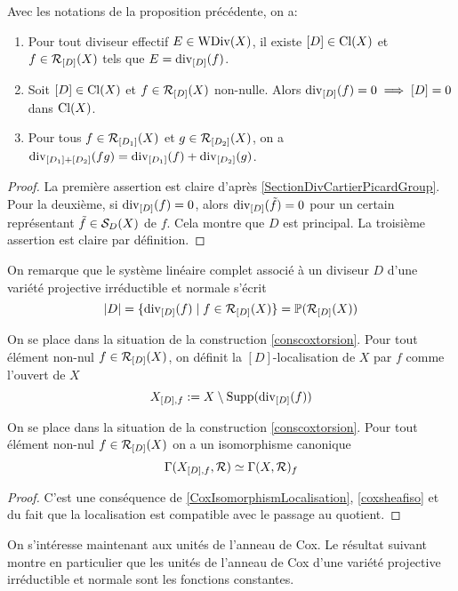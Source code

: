 \begin{prop}\label{diviCoxTorsFormulas}
Avec les notations de la proposition précédente, on a:
\begin{enumerate}
\item Pour tout diviseur effectif $E\in\operatorname{WDiv}(X)$, il existe $[D]\in\operatorname{Cl}(X)$ et $f\in\mathcal{R}_{[D]}(X)$ tels que $E=\operatorname{div}_{[D]}(f)$.
\item Soit $[D]\in\operatorname{Cl}(X)$ et $f\in\mathcal{R}_{[D]}(X)$ non-nulle. Alors $\operatorname{div}_{[D]}(f)=0\implies [D]=0$ dans $\operatorname{Cl}(X)$.
\item Pour tous $f\in\mathcal{R}_{[D_1]}(X)$ et $g\in\mathcal{R}_{[D_2]}(X)$, on a $\operatorname{div}_{[D_1]+[D_2]}(fg)=\operatorname{div}_{[D_1]}(f)+\operatorname{div}_{[D_2]}(g)$.
\end{enumerate}
\end{prop}
\begin{proof}
La première assertion est claire d'après \ref{SectionDivCartierPicardGroup}. Pour la deuxième, si $\operatorname{div}_{[D]}(f)=0$, alors $\operatorname{div}_{[D]}(\tilde{f})=0$ pour un certain représentant $\tilde{f}\in\mathcal{S}_D(X)$ de $f$. Cela montre que $D$ est principal. La troisième assertion est claire par définition.
\end{proof}

On remarque que le système linéaire complet associé à un diviseur $D$ d'une variété projective irréductible et normale s'écrit
$$|D|=\lbrace\operatorname{div}_{[D]}(f)\mid f\in \mathcal{R}_{[D]}(X)\rbrace = \mathbb{P}(\mathcal{R}_{[D]}(X))$$

\begin{defn}
On se place dans la situation de la construction \ref{conscoxtorsion}. Pour tout élément non-nul $f\in\mathcal{R}_{[D]}(X)$, on définit la $[D]$-localisation de $X$ par $f$ comme l'ouvert de $X$
$$X_{[D],f}:=X\setminus\operatorname{Supp}(\operatorname{div}_{[D]}(f))$$
\end{defn}

\begin{prop}
On se place dans la situation de la construction \ref{conscoxtorsion}. Pour tout élément non-nul $f\in\mathcal{R}_{[D]}(X)$ on a un isomorphisme canonique
$$\Gamma(X_{[D],f},\mathcal{R})\simeq \Gamma(X,\mathcal{R})_f$$
\end{prop}
\begin{proof}
C'est une conséquence de \ref{CoxIsomorphismLocalisation}, \ref{coxsheafiso} et du fait que la localisation est compatible avec le passage au quotient.
\end{proof}

On s'intéresse maintenant aux unités de l'anneau de Cox. Le résultat suivant montre en particulier que les unités de l'anneau de Cox d'une variété projective irréductible et normale sont les fonctions constantes.

